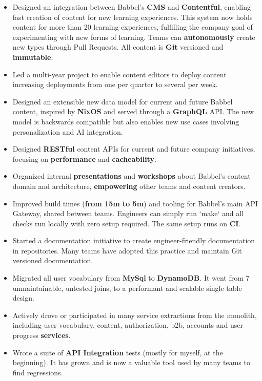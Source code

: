 \documentclass[10pt,a4paper,ragged2e,withhyper]{altacv}
\newcommand{\accentbold}[1]{\textbf{\textcolor{accent}{#1}}}
\begin{document}
\begin{paracol}{2}
{\begin{itemize}
\item Designed an integration between Babbel's \accentbold{CMS} and \accentbold{Contentful}, enabling fast creation of content for new learning experiences. This system now holds content for more than 20 learning experiences, fulfilling the company goal of experimenting with new forms of learning. Teams can \accentbold{autonomously} create new types through Pull Requests. All content is \accentbold{Git} versioned and \accentbold{immutable}.
\item Led a multi-year project to enable content editors to deploy content increasing deployments from one per quarter to several per week.
\item Designed an extensible new data model for current and future Babbel content, inspired by \accentbold{NixOS} and served through a \accentbold{GraphQL} API. The new model is backwards compatible but also enables new use cases involving personalization and AI integration.
\item Designed \accentbold{RESTful} content APIs for current and future company initiatives, focusing on \accentbold{performance} and \accentbold{cacheability}.
\item Organized internal \accentbold{presentations} and \accentbold{workshops} about Babbel's content domain and architecture, \accentbold{empowering} other teams and content creators.
\item Improved build times (\accentbold{from 15m to 5m}) and tooling for Babbel's main API Gateway, shared between teams. Engineers can simply run `make` and all checks run locally with zero setup required. The same setup runs on \accentbold{CI}.
\item Started a documentation initiative to create engineer-friendly documentation in repositories. Many teams have adopted this practice and maintain Git versioned documentation.
\item Migrated all user vocabulary from \accentbold{MySql} to \accentbold{DynamoDB}. It went from 7 unmaintainable, untested joins, to a performant and scalable single table design.
\item Actively drove or participated in many service extractions from the monolith, including user vocabulary, content, authorization, b2b, accounts and user progress \accentbold{services}.
\item Wrote a suite of \accentbold{API Integration} tests (mostly for myself, at the beginning). It has grown and is now a valuable tool used by many teams to find regressions.

\end{itemize}}
\end{paracol}
\end{document}
